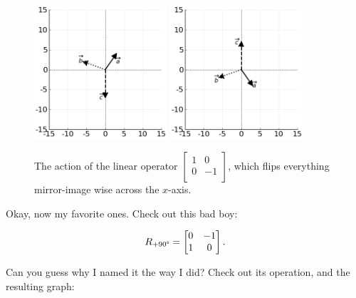 \begin{figure}[hb]
\centering
\vspace{.2in}
\includegraphics[width=0.44\textwidth]{preoperators.png}
\includegraphics[width=0.44\textwidth]{vertFlipOp.png}
\caption[.]{The action of the linear operator 
{\scriptsize $\begin{bmatrix} 1 & 0 \\ 0 & -1 \\
\end{bmatrix}$,} which flips everything mirror-image wise across the $x$-axis.}
\label{fig:vertFlipOp}
\end{figure}

\medskip

Okay, now my favorite ones. Check out this bad boy:

\vspace{-.15in}
\begin{align*}
R_{+90\degree} =
\begin{bmatrix}
0 & -1 \\
1 & 0 \\
\end{bmatrix}.
\end{align*}
\vspace{-.15in}

Can you guess why I named it the way I did? Check out its operation, and the
resulting graph:

